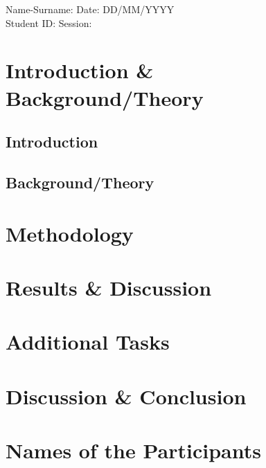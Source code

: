 \documentclass[10pt]{article}
\begin{document}
\begin{table}[htbp]
\begin{tabularx}{}
Name-Surname: \hfill Date: DD/MM/YYYY \\ 
Student ID:   \hfill Session:         \\ 
\end{tabularx}
\end{table}



\section{Introduction \& Background/Theory}

\subsection{Introduction}

\subsection{Background/Theory}


\section{Methodology}

\section{Results \& Discussion}

\section{Additional Tasks}


\section{Discussion \& Conclusion}



\section{Names of the Participants}
\end{document}

